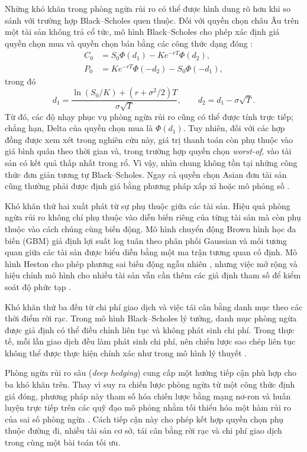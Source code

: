 Những khó khăn trong phòng ngừa rủi ro có thể được hình dung rõ hơn khi so
sánh với trường hợp Black--Scholes quen thuộc. Đối với quyền chọn châu Âu trên
một tài sản không trả cổ tức, mô hình Black--Scholes cho phép xác định giá
quyền chọn mua và quyền chọn bán bằng các công thức dạng đóng
\parencite{BlackScholes1973}:
\begin{align}
C_0 &= S_0\Phi(d_1)-Ke^{-rT}\Phi(d_2),\\
P_0 &= Ke^{-rT}\Phi(-d_2)-S_0\Phi(-d_1),
\end{align}
trong đó
\begin{equation}
d_1=\frac{\ln(S_0/K)+(r+\sigma^2/2)T}{\sigma\sqrt{T}},
\qquad
d_2=d_1-\sigma\sqrt{T}.
\end{equation}
Từ đó, các độ nhạy phục vụ phòng ngừa rủi ro cũng có thể được tính trực tiếp;
chẳng hạn, Delta của quyền chọn mua là $\Phi(d_1)$. Tuy nhiên, đối với các
hợp đồng được xem xét trong nghiên cứu này, giá trị thanh toán còn phụ thuộc
vào giá bình quân theo thời gian và, trong trường hợp quyền chọn
\textit{worst-of}, vào tài sản có kết quả thấp nhất trong rổ. Vì vậy, nhìn
chung không tồn tại những công thức đơn giản tương tự Black--Scholes. Ngay cả
quyền chọn Asian đơn tài sản cũng thường phải được định giá bằng phương pháp
xấp xỉ hoặc mô phỏng số \parencite{KemnaVorst1990}.

Khó khăn thứ hai xuất phát từ sự phụ thuộc giữa các tài sản. Hiệu quả phòng
ngừa rủi ro không chỉ phụ thuộc vào diễn biến riêng của từng tài sản mà còn
phụ thuộc vào cách chúng cùng biến động. Mô hình chuyển động Brown hình học đa
biến (\textsc{GBM}) giả định lợi suất log tuân theo phân phối Gaussian và mối
tương quan giữa các tài sản được biểu diễn bằng một ma trận tương quan cố
định. Mô hình Heston cho phép phương sai biến động ngẫu nhiên
\parencite{Heston1993}, nhưng việc mở rộng và hiệu chỉnh mô hình cho nhiều tài
sản vẫn cần thêm các giả định tham số để kiểm soát độ phức tạp
\parencite{Dimitroff2011}.

Khó khăn thứ ba đến từ chi phí giao dịch và việc tái cân bằng danh mục theo
các thời điểm rời rạc. Trong mô hình Black--Scholes lý tưởng, danh mục phòng
ngừa được giả định có thể điều chỉnh liên tục và không phát sinh chi phí.
Trong thực tế, mỗi lần giao dịch đều làm phát sinh chi phí, nên chiến lược sao
chép liên tục không thể được thực hiện chính xác như trong mô hình lý thuyết
\parencite{BlackScholes1973,Leland1985}.

Phòng ngừa rủi ro sâu (\textit{deep hedging}) cung cấp một hướng tiếp cận phù
hợp cho ba khó khăn trên. Thay vì suy ra chiến lược phòng ngừa từ một công
thức định giá đóng, phương pháp này tham số hóa chiến lược bằng mạng nơ-ron và
huấn luyện trực tiếp trên các quỹ đạo mô phỏng nhằm tối thiểu hóa một hàm rủi
ro của sai số phòng ngừa \parencite{Buehler2019}. Cách tiếp cận này cho phép
kết hợp quyền chọn phụ thuộc đường đi, nhiều tài sản cơ sở, tái cân bằng rời
rạc và chi phí giao dịch trong cùng một bài toán tối ưu.

